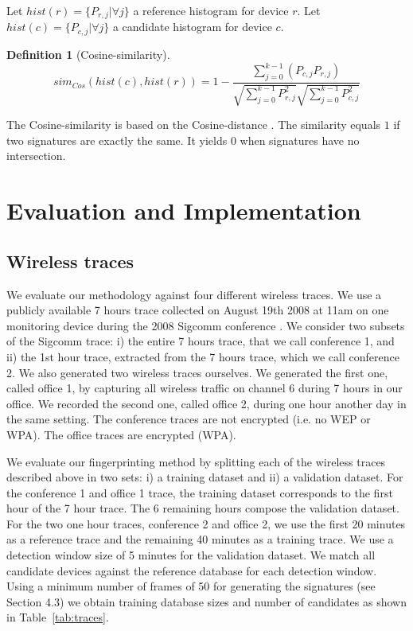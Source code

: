 \documentclass[10pt, conference, compsocconf, letterpaper]{IEEEtran}
\newtheorem{defn}{Definition}
\begin{document}
Let $hist(r)=\{P_{r,j}|\forall j\}$ a reference histogram for device $r$. 
Let $hist(c)=\{P_{c,j}|\forall j\}$ a  candidate histogram for device $c$.

\begin{defn}[Cosine-similarity]
$$
sim_{Cos}(hist(c),hist(r)) = 1 - \frac{\sum_{j=0}^{k-1} (P_{c,j}P_{r,j})}{ \sqrt{\sum_{j=0}^{k-1} P_{r,j}^2} \sqrt{\sum_{j=0}^{k-1} P_{c,j}^2}}
$$
\end{defn}

The Cosine-similarity is based on the Cosine-distance \cite{Cha:MATH08}.
The similarity equals $1$ if two signatures are exactly the same.
It yields $0$ when signatures have no intersection.












\section{Evaluation and Implementation}
\label{sec:eval}








\subsection{Wireless traces}


We evaluate our methodology against four different wireless traces. 
We use a publicly available 7 hours trace collected on August 19th 2008 at 11am
on one monitoring device during the 2008 Sigcomm conference \cite{umd-sigcomm2008-2009-03-02}. 
We consider two subsets of the Sigcomm trace: i) the entire 7 hours trace, that we call conference 1, and ii)
the 1st hour trace, extracted from the 7 hours trace, which we call conference 2.
We also generated two wireless traces ourselves. We generated the first one, called office 1, by capturing all wireless 
traffic on channel 6 during 7 hours in our office. We recorded the second one, called office 2, during one hour another day in the same setting. 
The conference traces are not encrypted (i.e. no WEP or WPA). 
The office traces are encrypted (WPA).


We evaluate our fingerprinting method by splitting each of the wireless traces described above
in two sets: i) a training dataset and ii) a validation dataset.
For the conference 1 and office 1 trace, the training dataset corresponds to the first hour of the 7 hour trace. The 6 remaining hours compose the validation dataset. For the two one hour traces, conference 2 and office 2,  we use
the first 20 minutes as a reference trace and the remaining 40 minutes as a training trace.
We use a detection window size of 5 minutes for the validation dataset. We match all candidate devices against the
reference database for each detection window. Using a minimum number of frames of 50 for generating
the signatures (see Section 4.3) we obtain training database sizes and number of candidates as shown in Table~\ref{tab:traces}.
\end{document}
